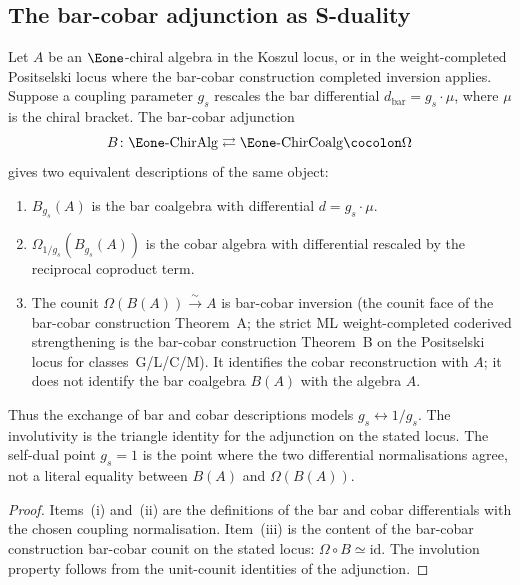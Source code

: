 \subsection{The bar-cobar adjunction as S-duality}
\label{subsec:bar-cobar-s-duality}

\begin{proposition}
\label{prop:bar-cobar-s-duality}
Let $A$ be an $\Eone$-chiral algebra in the Koszul locus, or in the
weight-completed Positselski locus where the bar-cobar construction completed inversion
applies. Suppose a coupling parameter $g_s$ rescales the bar differential
$d_{\mathrm{bar}} = g_s \cdot \mu$, where $\mu$ is the chiral bracket.
The bar-cobar adjunction
\[
 B \colon \Eone\text{-}\mathrm{ChirAlg} \rightleftarrows \Eone\text{-}\mathrm{ChirCoalg} \cocolon \Omega
\]
gives two equivalent descriptions of the same object:
\begin{enumerate}[label=\textup{(\roman*)}]
 \item $B_{g_s}(A)$ is the bar coalgebra with differential
 $d = g_s \cdot \mu$.
 \item $\Omega_{1/g_s}(B_{g_s}(A))$ is the cobar algebra with differential
 rescaled by the reciprocal coproduct term.
 \item The counit
 $\Omega(B(A)) \xrightarrow{\sim} A$ is bar-cobar inversion
 \textup{(}the counit face of the bar-cobar construction Theorem~A; the strict ML
 weight-completed coderived strengthening is the bar-cobar construction Theorem~B on the
 Positselski locus for classes~G/L/C/M\textup{).} It identifies the cobar
 reconstruction with $A$; it does not identify the bar coalgebra $B(A)$
 with the algebra $A$.
\end{enumerate}
Thus the exchange of bar and cobar descriptions models
$g_s \leftrightarrow 1/g_s$. The involutivity is the triangle identity
for the adjunction on the stated locus. The self-dual point $g_s = 1$ is
the point where the two differential normalisations agree, not a
literal equality between $B(A)$ and $\Omega(B(A))$.
\end{proposition}

\begin{proof}
Items~(i) and~(ii) are the definitions of the bar and cobar
differentials with the chosen coupling normalisation. Item~(iii) is the
content of the bar-cobar construction bar-cobar counit on the stated locus:
$\Omega \circ B \simeq \mathrm{id}$. The involution property follows
from the unit-counit identities of the adjunction.
\end{proof}

